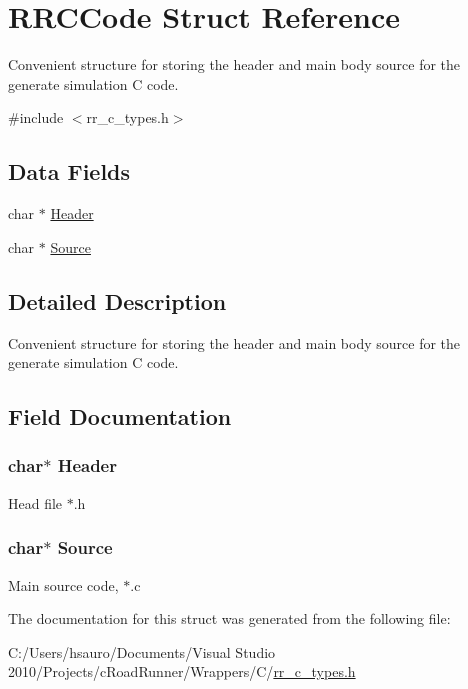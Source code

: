 \hypertarget{struct_r_r_c_code}{
\section{\-R\-R\-C\-Code \-Struct \-Reference}
\label{struct_r_r_c_code}
}


\-Convenient structure for storing the header and main body source for the generate simulation \-C code.  




{\ttfamily \#include $<$rr\-\_\-c\-\_\-types.\-h$>$}

\subsection*{\-Data \-Fields}
\begin{DoxyCompactItemize}
\item 
char $\ast$ \hyperlink{struct_r_r_c_code_a129503fa396e877e8400bb7cdc9774b5}{\-Header}
\item 
char $\ast$ \hyperlink{struct_r_r_c_code_a23fa2e731d8e1576c9095868b9651305}{\-Source}
\end{DoxyCompactItemize}


\subsection{\-Detailed \-Description}
\-Convenient structure for storing the header and main body source for the generate simulation \-C code. 

\subsection{\-Field \-Documentation}
\hypertarget{struct_r_r_c_code_a129503fa396e877e8400bb7cdc9774b5}{
\subsubsection[{\-Header}]{\setlength{\rightskip}{0pt plus 5cm}char$\ast$ {\bf \-Header}}}
\label{struct_r_r_c_code_a129503fa396e877e8400bb7cdc9774b5}
\-Head file $\ast$.h \hypertarget{struct_r_r_c_code_a23fa2e731d8e1576c9095868b9651305}{
\subsubsection[{\-Source}]{\setlength{\rightskip}{0pt plus 5cm}char$\ast$ {\bf \-Source}}}
\label{struct_r_r_c_code_a23fa2e731d8e1576c9095868b9651305}
\-Main source code, $\ast$.c 

\-The documentation for this struct was generated from the following file\-:\begin{DoxyCompactItemize}
\item 
\-C\-:/\-Users/hsauro/\-Documents/\-Visual Studio 2010/\-Projects/c\-Road\-Runner/\-Wrappers/\-C/\hyperlink{rr__c__types_8h}{rr\-\_\-c\-\_\-types.\-h}\end{DoxyCompactItemize}
